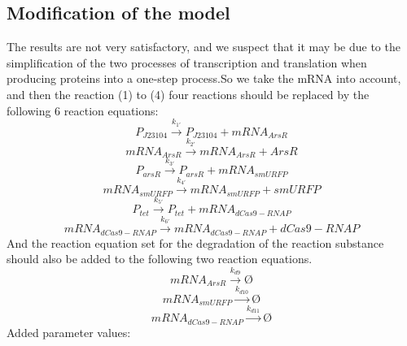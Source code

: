 \subsection{Modification of the model}
The results are  not very satisfactory, and we suspect that it may be due to the simplification of the two processes of transcription and translation when producing proteins into a one-step process.So we take the mRNA into account, and then the reaction (1) to (4) four reactions should be replaced by the  following 6 reaction equations:
\begin{equation}
P_{J23104} \stackrel{k_{1'}}{\longrightarrow} P_{J23104}+mRNA_{ArsR}
\end{equation}
\begin{equation}
mRNA_{ArsR}\stackrel{k_{2'}}{\longrightarrow} mRNA_{ArsR}+ArsR
\end{equation}
\begin{equation}
P_{arsR} \stackrel{k_{3'}}{\longrightarrow} P_{arsR} +mRNA_{smURFP}
\end{equation}
\begin{equation}
mRNA_{smURFP} \stackrel{k_{4'}}{\longrightarrow} mRNA_{smURFP}+ smURFP
\end{equation}
\begin{equation}
P_{tet} \stackrel{k_{5'}}{\longrightarrow} P_{tet} +mRNA_{dCas9-RNAP}
\end{equation}
\begin{equation}
mRNA_{dCas9-RNAP} \stackrel{k_{6'}}{\longrightarrow} mRNA_{dCas9-RNAP}+dCas9-RNAP
\end{equation}
And the reaction equation set for the degradation of the reaction substance should also be added to the following two reaction equations.
\begin{equation}
mRNA_{ArsR}\stackrel{k_{d9}}{\longrightarrow}Ø
\end{equation}
\begin{equation}
mRNA_{smURFP}\stackrel{k_{d10}}{\longrightarrow}Ø
\end{equation}
\begin{equation}
mRNA_{dCas9-RNAP}\stackrel{k_{d11}}{\longrightarrow}Ø
\end{equation}
Added parameter values:
